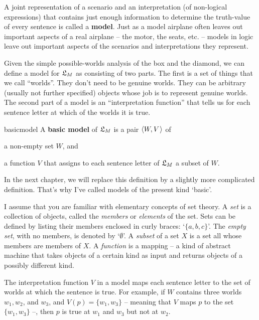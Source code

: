 A joint representation of a scenario and an interpretation (of non-logical
expressions) that contains just enough information to determine the truth-value
of every sentence is called a \textbf{model}. Just as a model airplane often
leaves out important aspects of a real airplane -- the motor, the seats, etc. --
models in logic leave out important aspects of the scenarios and
interpretations they represent.

Given the simple possible-worlds analysis of the box and the diamond, we can
define a model for $\mathfrak{L}_{M}$ as consisting of two parts. The first is a set of
things that we call ``worlds''. They don't need to be genuine worlds. They can
be arbitrary (usually not further specified) objects whose job is to represent
genuine worlds. The second part of a model is an ``interpretation function''
that tells us for each sentence letter at which of the worlds it is true.

\begin{definition}{}{basicmodel}
  A \textbf{basic model} of $\mathfrak{L}_M$ is a pair $\t{W,V}$ of%
  \vspace{-3mm}
  \begin{itemize*}
  \item a non-empty set $W$, and
  \item a function $V$ that assigns to each sentence letter of $\mathfrak{L}_M$
  a subset of $W$.
  \end{itemize*}
\end{definition}
\noindent
In the next chapter, we will replace this definition by a slightly more
complicated definition. That's why I've called models of the present kind
`basic'.

I assume that you are familiar with elementary concepts of set theory. A \emph{set} is
a collection of objects, called the \emph{members} or \emph{elements} of the
set. Sets can be defined by listing their members enclosed in curly braces:
`$\{ a, b, c \}$'. The \emph{empty set}, with no members, is denoted by
`$\emptyset$'. A \emph{subset} of a set $X$ is a set all whose members are
members of $X$. A \emph{function} is a mapping -- a kind of abstract machine
that takes objects of a certain kind as input and returns objects of a possibly
different kind.

The interpretation function $V$ in a model maps each sentence letter to the set
of worlds at which the sentence is true. For example, if $W$ contains three
worlds $w_{1}, w_{2}$, and $w_{3}$, and $V(p) = \{ w_{1}, w_{3} \}$ -- meaning
that $V$ maps $p$ to the set $\{ w_{1}, w_{3} \}$ --, then $p$ is true at
$w_{1}$ and $w_{3}$ but not at $w_{2}$.

